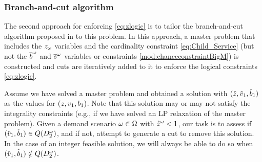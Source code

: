 \documentclass[msom]{oo}
\begin{document}
\subsubsection{Branch-and-cut algorithm}
\label{sec:bnc}

The second approach for enforcing 
\eqref{eq:zlogic}
is to tailor the branch-and-cut algorithm proposed in \citep{luedtke2014branch} to this problem. 
In this approach, a master problem that includes the $z_\omega$ variables and the cardinality constraint 
\eqref{eq:Child_Service} (but not the $\overline{b}^{\omega}$ and $\overline{s}^{\omega}$ variables or constraints \eqref{mod:chanceconstraintBigM}) is constructed and cuts are iteratively added to it to enforce the logical constraints \eqref{eq:zlogic}. 

Assume we have solved a master problem and obtained a solution with $(\hat{z},\hat{v}_1,\hat{b}_1)$ as the values for $(z,v_1,b_1)$. Note that this solution may or may not satisfy the integrality constraints (e.g., if we have solved an LP relaxation of the master problem). Given a demand scenario $\omega \in \Omega$ with $\hat{z}^\omega < 1$, our task is to assess if $(\hat{v}_1,\hat{b}_1) \in Q(D^\omega_2)$, and if not, attempt to generate a cut to remove this solution. In the case of an integer feasible solution, we will always be able to do so when $(\hat{v}_1,\hat{b}_1) \notin Q(D_2^\omega)$.
\end{document}
